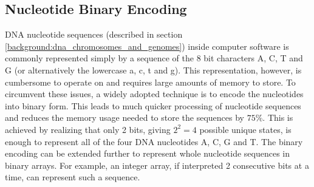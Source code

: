 \subsection{Nucleotide Binary Encoding} \label{background:nucleotide_binary_encoding}

DNA nucleotide sequences (described in section \ref{background:dna_chromosomes_and_genomes}) inside computer software is commonly represented simply by a sequence of the 8 bit characters A, C, T and G (or alternatively the lowercase a, c, t and g).
This representation, however, is cumbersome to operate on and requires large amounts of memory to store.
To circumvent these issues, a widely adopted technique is to encode the nucleotides into binary form.
This leads to much quicker processing of nucleotide sequences and reduces the memory usage needed to store the sequences by $75\%$.
This is achieved by realizing that only 2 bits, giving \textit{$2^2=4$} possible unique states, is enough to represent all of the four DNA nucleotides A, C, G and T.
The binary encoding can be extended further to represent whole nucleotide sequences in binary arrays.
For example, an integer array, if interpreted 2 consecutive bits at a time, can represent such a sequence.


